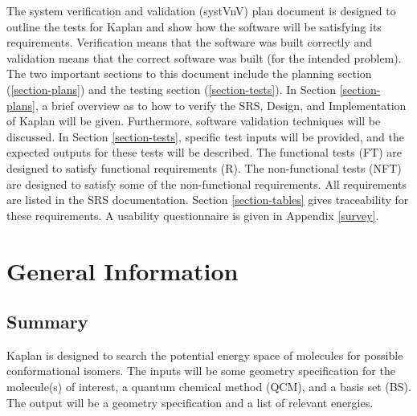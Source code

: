 \documentclass[12pt, titlepage]{article}
\newcommand{\progname}{Kaplan} %
\begin{document}
\tableofcontents

\listoftables

\listoffigures

\newpage


The system verification and validation (systVnV) plan document is designed to 
outline the tests for \progname{} and show how the software will be satisfying 
its requirements. Verification means that the software was built correctly and 
validation means that the correct software was built (for the intended 
problem). The two important sections to this document include the planning 
section (\ref{section-plans}) and the testing section (\ref{section-tests}). In 
Section \ref{section-plans}, a brief overview as to how to verify the SRS, 
Design, and Implementation of \progname{} will be given. Furthermore, software 
validation techniques will be discussed. In Section \ref{section-tests}, 
specific test inputs will be provided, and the expected outputs for these tests 
will be described. The functional tests (FT) are designed to satisfy functional 
requirements (R). The non-functional tests (NFT) are designed to satisfy some 
of the non-functional requirements. All requirements are listed in the SRS 
documentation. Section \ref{section-tables} gives traceability for these 
requirements. A usability questionnaire is given in Appendix \ref{survey}.


\section{General Information}

\subsection{Summary}

\progname{} is designed to search the potential energy space of molecules for 
possible conformational isomers. The inputs will be some geometry specification 
for the molecule(s) of interest, a quantum chemical method (QCM), and a basis 
set (BS). The output will be a geometry specification and a list of relevant 
energies. 

\end{document}
